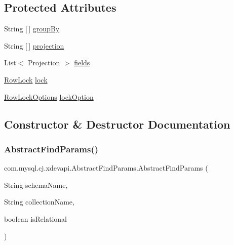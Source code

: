 \subsection*{Protected Attributes}
\begin{DoxyCompactItemize}
\item 
String \mbox{[}$\,$\mbox{]} \mbox{\hyperlink{classcom_1_1mysql_1_1cj_1_1xdevapi_1_1_abstract_find_params_af3bcff376fbbd9c8844219fb37404547}{group\+By}}
\item 
String \mbox{[}$\,$\mbox{]} \mbox{\hyperlink{classcom_1_1mysql_1_1cj_1_1xdevapi_1_1_abstract_find_params_aa2f21464c6948fd8938d5663b997a18a}{projection}}
\item 
List$<$ Projection $>$ \mbox{\hyperlink{classcom_1_1mysql_1_1cj_1_1xdevapi_1_1_abstract_find_params_a910c634442c878086a71cfac6f984f3f}{fields}}
\item 
\mbox{\hyperlink{enumcom_1_1mysql_1_1cj_1_1xdevapi_1_1_find_params_1_1_row_lock}{Row\+Lock}} \mbox{\hyperlink{classcom_1_1mysql_1_1cj_1_1xdevapi_1_1_abstract_find_params_a5678caf52fa61223c04440a9d9c0a63b}{lock}}
\item 
\mbox{\hyperlink{enumcom_1_1mysql_1_1cj_1_1xdevapi_1_1_find_params_1_1_row_lock_options}{Row\+Lock\+Options}} \mbox{\hyperlink{classcom_1_1mysql_1_1cj_1_1xdevapi_1_1_abstract_find_params_a377d2b6854306fcce18c8a69f5ee5453}{lock\+Option}}
\end{DoxyCompactItemize}


\subsection{Constructor \& Destructor Documentation}
\mbox{\label{classcom_1_1mysql_1_1cj_1_1xdevapi_1_1_abstract_find_params_a1a25b8361fcaa3bb7b30a1a3f5fa51f7}} 
\subsubsection{\texorpdfstring{Abstract\+Find\+Params()}{AbstractFindParams()}\hspace{0.1cm}{\footnotesize\ttfamily [1/3]}}
{\footnotesize\ttfamily com.\+mysql.\+cj.\+xdevapi.\+Abstract\+Find\+Params.\+Abstract\+Find\+Params (\begin{DoxyParamCaption}\item[{String}]{schema\+Name,  }\item[{String}]{collection\+Name,  }\item[{boolean}]{is\+Relational }\end{DoxyParamCaption})}


